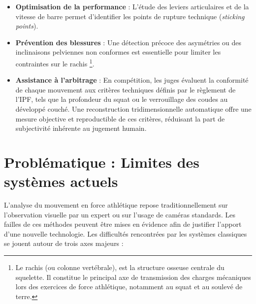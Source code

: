 \begin{itemize}
  \item \textbf{Optimisation de la performance} : L'étude des leviers articulaires et de la vitesse de barre permet d'identifier les points de rupture technique (\textit{sticking points}).

  \item \textbf{Prévention des blessures} : Une détection précoce des asymétries ou des inclinaisons pelviennes non conformes est essentielle pour limiter les contraintes sur le rachis \footnote{Le rachis (ou colonne vertébrale), est la structure osseuse centrale du squelette. Il constitue le principal axe de transmission des charges mécaniques lors des exercices de force athlétique, notamment au squat et au soulevé de terre.}.

  \item \textbf{Assistance à l'arbitrage} : En compétition, les juges évaluent la conformité de chaque mouvement aux critères techniques définis par le règlement de l'IPF\cite{IPF-Technical-Regulations-2025}, tels que la profondeur du squat ou le verrouillage des coudes au développé couché. Une reconstruction tridimensionnelle automatique offre une mesure objective et reproductible de ces critères, réduisant la part de subjectivité inhérente au jugement humain.
\end{itemize}

\section{Problématique : Limites des systèmes actuels} \label{one_two}

L'analyse du mouvement en force athlétique repose traditionnellement sur l'observation visuelle par un expert ou sur l'usage de caméras standards. Les failles de ces méthodes peuvent être mises en évidence afin de justifier l'apport d'une nouvelle technologie. Les difficultés rencontrées par les systèmes classiques se jouent autour de trois axes majeurs :

